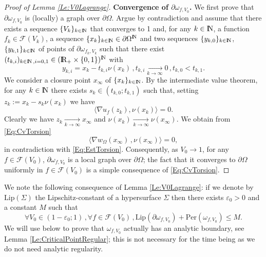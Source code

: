 \documentclass{article}
\newcommand{\R}{\textnormal{I\kern-0.21emR}}
\newcommand{\N}{\textnormal{I\kern-0.21emN}}
\renewcommand{\leq}{\leqslant}
\def\e{{\varepsilon}}
\def\O{{\Omega}}
\def\n{{\nabla}}
\numberwithin{equation}{section}
\begin{document}
\begin{proof}[Proof of Lemma \ref{Le:V0Lagrange}]
\noindent \textbf{Convergence of $\partial \omega_{f,V_0}$.}
We first prove that  $\partial \omega_{f,V_0}$ is (locally) a graph over $\partial \O$. Argue by contradiction and assume that there exists a sequence $\{V_k\}_{k\in \N}$ that converges to 1 and, for any $k\in \N$, a function  $f_k\in \mathcal F(V_k)$, a sequence $\{x_k\}_{k\in \N}\in \partial \O^\N$ and two sequences $\{y_{k,0}\}_{k\in \N}$, $\{ y_{k,1}\}_{k\in \N}$ of points of $\partial \omega_{f_k,V_k}$ such that there exist $(t_{k,i})_{k\in \N\,, i=0,1}\in (\R_+\times \{0,1\})^\N$ with 
\[ y_{k,i}=x_k-t_{k,i}\nu(x_k)\,, t_{k,i}\underset{k\to \infty}\rightarrow 0\,, t_{k,0}< t_{k,1}.\]
We consider a closure point $x_\infty$ of $\{x_k\}_{k\in \N}$. By the intermediate value theorem, for any $k\in \N$ there exists $s_k\in (t_{k,0};t_{k,1})$ such that, setting $z_k:=x_k-s_k\nu(x_k)$ we have 
\[ \langle \n u_f(z_k),\nu(x_k)\rangle=0.\] Clearly we have $z_k\underset{k\to \infty}\rightarrow x_\infty$ and $\nu(x_k)\underset{k\to \infty}\rightarrow \nu(x_\infty)$. We obtain from \eqref{Eq:CvTorsion}
\[ \langle \n w_\O(x_\infty)\,, \nu(x_\infty)\rangle=0,\] in contradiction with \eqref{Eq:EstTorsion}. Consequently, as $V_0\to 1$, for any $f\in \mathcal F(V_0)$, $\partial \omega_{f,V_0}$ is a local graph over $\partial \O$; the fact that it converges to $\partial \O$ uniformly in $f\in \mathcal F(V_0)$ is a simple consequence of \eqref{Eq:CvTorsion}.


\end{proof}

We note the following consequence of Lemma \ref{Le:V0Lagrange}: if we denote by $\mathrm{Lip}(\Sigma)$ the Lipschitz-constant of a hypersurface $\Sigma$ then there exists $\e_0>0$ and a constant $M$ such that 
\begin{equation}\label{Eq:EstPerim} \forall V_0\in (1-\e_0;1)\,, \forall f \in \mathcal F(V_0)\,, \mathrm{Lip}(\partial \omega_{f,V_0})+\mathrm{Per}(\omega_{f,V_0})\leq M.\end{equation}
We will use below  \cite[Lemma 3]{Chanillo_2000} to prove that $\omega_{f,V_0}$ actually has an analytic boundary, see Lemma \ref{Le:CriticalPointRegular}; this is not necessary for the time being as we do not need analytic regularity.
\end{document}
